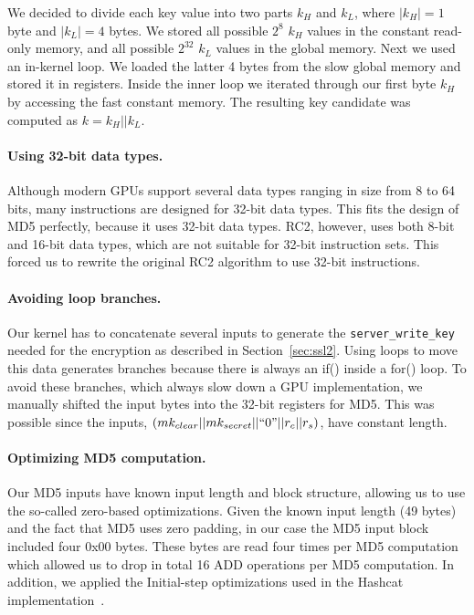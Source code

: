 We decided to divide each key value into two parts $k_H$ and $k_L$, where $|k_H|=1$ byte and $|k_L|=4$ bytes. We stored all possible $2^8$ $k_H$ values in the constant read-only memory, and all possible $2^{32}$  $k_L$ values in the global memory. 
Next we used an in-kernel loop. We loaded the latter 4 bytes from the slow global memory and stored it in registers. Inside the inner loop we iterated through our first byte $k_H$ by accessing the fast constant memory. The resulting key candidate was computed as $k=k_H||k_L$. 
	
\paragraph{Using 32-bit data types.}
Although modern GPUs support several data types ranging in size from 8 to 64 bits, many instructions are designed for 32-bit data types. This fits the design of MD5 perfectly, because it uses 32-bit data types. RC2, however, uses both 8-bit and 16-bit data types, which are not suitable for 32-bit instruction sets. This forced us to rewrite the original RC2 algorithm to use 32-bit instructions.
	
\paragraph{Avoiding loop branches.} Our kernel has to concatenate several inputs to generate the \texttt{server\_write\_key} needed for the encryption as described in Section~\ref{sec:ssl2}. Using loops to move this data generates branches because there is always an if() inside a for() loop. To avoid these branches, which always slow down a GPU implementation, we manually shifted the input bytes into the 32-bit registers for MD5. This was possible since the \hashcomputation inputs,
$(mk_{clear} || mk_{secret} || ``0" || r_c || r_s)$,
have constant length.

\paragraph{Optimizing MD5 computation.} Our MD5 inputs have known input length and block structure, allowing us to use the so-called zero-based optimizations.  Given the known input length (49 bytes) and the fact that MD5 uses zero padding, in our case the MD5 input block included four 0x00 bytes. These  bytes are read four times per MD5 computation which allowed us to drop in total 16 ADD operations per MD5 computation. In addition, we applied the Initial-step optimizations used in the Hashcat implementation~\cite{hashcat-talk}.

